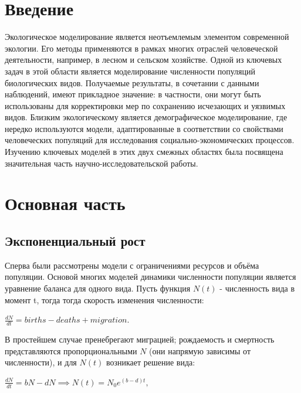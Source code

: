 \documentclass[a4paper, 14pt]{extarticle}
\begin{document}
\tableofcontents

\newpage

\section*{Введение}

Экологическое моделирование является неотъемлемым элементом современной экологии. Его методы применяются в рамках многих отраслей человеческой деятельности, например, в лесном и сельском хозяйстве. Одной из ключевых задач в этой области является моделирование численности популяций биологических видов. Получаемые результаты, в сочетании с данными наблюдений, имеют прикладное значение: в частности, они могут быть использованы для корректировки мер по сохранению исчезающих и уязвимых видов. Близким экологическому является демографическое моделирование, где нередко используются модели, адаптированные в соответствии со свойствами человеческих популяций для исследования социально-экономических процессов. Изучению ключевых моделей в этих двух смежных областях была посвящена значительная часть научно-исследовательской работы.

\newpage

\section*{Основная часть}

\subsection{Экспоненциальный рост}
Сперва были рассмотрены модели с ограничениями ресурсов и объёма популяции. Основой многих моделей динамики численности популяции является уравнение баланса для одного вида. Пусть функция $N(t)$ - численность вида в момент t, тогда тогда скорость изменения численности: 

\begin{center}
$\frac{dN}{dt}= births-deaths+migration.$
\end{center}

В простейшем случае пренебрегают миграцией; рождаемость и смертность представляются пропорциональными $N$ (они напрямую зависимы от численности), и для $ N(t)$ возникает решение вида:

\begin{center}
$\frac{dN}{dt}= bN-dN \implies N(t) = N_0e^{(b-d)t},$
\end{center}
\end{document}

